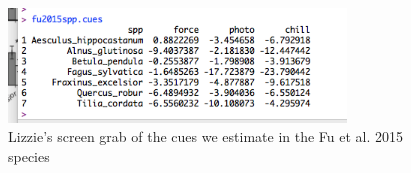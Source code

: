 \documentclass[11pt,letterpaper]{article}
\begin{document}
\begin{figure}[t!]
\centering
\includegraphics[width=0.8\textwidth]{figures/fuspp.png}
\caption{Lizzie's screen grab of the cues we estimate in the Fu et al. 2015 species}
  \label{fig:fuspp}
\end{figure}
\clearpage
\end{document}
